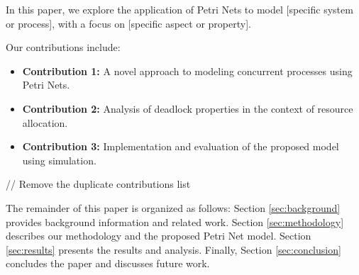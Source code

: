 In this paper, we explore the application of Petri Nets to model [specific system or process], with a focus on [specific aspect or property]. %

Our contributions include:
\begin{itemize}[leftmargin=*,align=left]
    \item \textbf{Contribution 1:} A novel approach to modeling concurrent processes using Petri Nets.
    \item \textbf{Contribution 2:} Analysis of deadlock properties in the context of resource allocation.
    \item \textbf{Contribution 3:} Implementation and evaluation of the proposed model using simulation.
\end{itemize}

// Remove the duplicate contributions list

The remainder of this paper is organized as follows: Section \ref{sec:background} provides background information and related work. Section \ref{sec:methodology} describes our methodology and the proposed Petri Net model. Section \ref{sec:results} presents the results and analysis. Finally, Section \ref{sec:conclusion} concludes the paper and discusses future work.